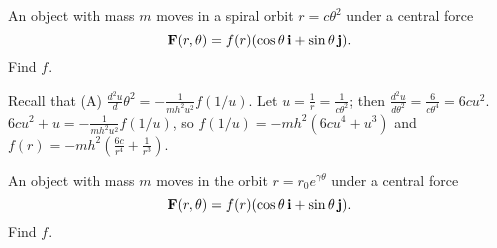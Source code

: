 \documentclass{ximera}
\begin{document}
\begin{problem}\label{exer:6.4.4}
 An object with mass $m$  moves in a spiral orbit
$r=c\theta^2$ under a central force
$$
{\bf
F}(r,\theta)=f(r)(\cos\theta\,{\bf i}+\sin\theta\,{\bf j}).
$$
Find $f$.

\begin{solution}
    Recall that
(A) $\frac{d^{2}u}d{\theta^{2}}=-\frac{1}{mh^{2}u^{2}}f(1/u)$.
Let $u=\frac{1}{ r}=\frac{1}{ c\theta^2}$; then $\frac{d^2u}{
d\theta^2}=\frac{6}{ c\theta^4}= 6cu^2$.
 $6cu^2+u=-\frac{1}{ mh^2u^2}f(1/u)$, so
$f(1/u)=-mh^2(6cu^4+u^3)$ and $f(r)=-mh^2\left(\frac{6c}{
r^4}+\frac{1}{ r^3}\right)$.
\end{solution}
\end{problem}

\begin{problem}\label{exer:6.4.5}
 An object with mass $m$  moves in the orbit
$r=r_0e^{\gamma\theta}$ under a central force
$$
 {\bf
F}(r,\theta)=f(r)(\cos\theta\,{\bf i}+\sin\theta\,{\bf j}).
$$
 Find $f$.
\end{problem}
\end{document}
